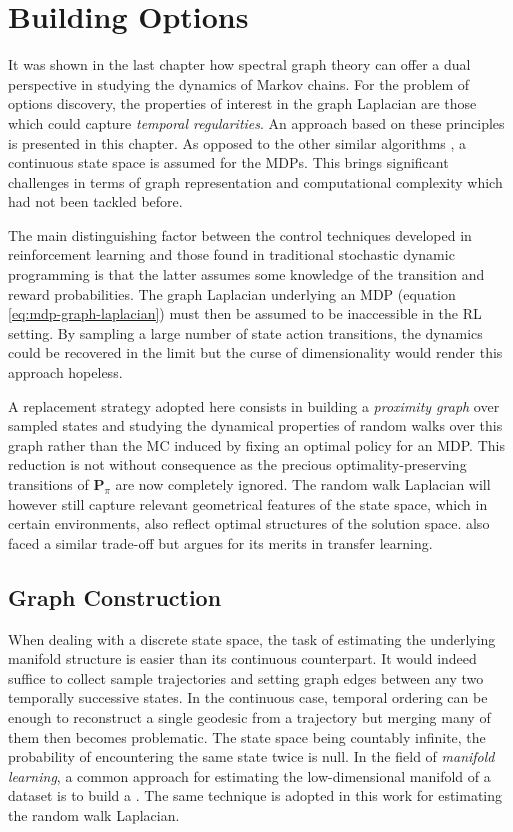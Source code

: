 \documentclass[12pt, oneside, extrafontsizes]{memoir}  %
\newcommand{\termidx}[1]{\index{#1}{\textbf{#1}}}
\theoremstyle{plain}
\theoremstyle{definition}
\begin{document}
\chapter{Building Options}

It was shown in the last chapter how spectral graph theory can offer a dual perspective
in studying the dynamics of Markov chains. For the problem of options discovery, the
properties of interest in the graph Laplacian are those which could capture
\textit{temporal regularities}. An approach based on these principles is presented in this chapter. As opposed to the other similar algorithms \cite{Menache2002, Mannor2004, Mathew2012, Bouvrie2012}, a continuous state space is assumed for the MDPs. This brings significant challenges in terms of graph representation and computational complexity which had not been tackled before.

The main distinguishing factor between the control techniques developed in
reinforcement learning and those found in traditional stochastic dynamic programming
is that the latter assumes some knowledge of the transition and reward probabilities. The graph Laplacian underlying an MDP (equation \ref{eq:mdp-graph-laplacian}) must then be assumed to be inaccessible in the RL setting. By sampling a large number of state action transitions, the dynamics could be recovered in the limit but the curse of dimensionality would render this approach hopeless.

A replacement strategy adopted here consists in building a \textit{proximity graph}
over sampled states and studying the dynamical properties of random walks over this
graph rather than the MC induced by fixing an optimal policy for an MDP. This reduction is not without consequence as the precious optimality-preserving transitions of $\mathbf{P}_\pi$ are now completely ignored. The random walk Laplacian will however still capture relevant geometrical features of the state space, which in certain environments,  also reflect optimal structures of the solution space. \cite{Mahadevan2007} also faced a similar trade-off but argues for its merits in transfer learning.

\section{Graph Construction}

When dealing with a discrete state space, the task of estimating the underlying manifold structure is easier than its continuous counterpart. It would indeed suffice to collect sample trajectories and setting graph edges between any two temporally successive states. In the continuous case, temporal ordering can be enough to reconstruct a single geodesic from a trajectory but merging many of them then becomes problematic. The state space being countably infinite, the probability of encountering the same state twice is null.  In the field of \textit{manifold learning}, a common approach for estimating the low-dimensional manifold of a dataset is to build a \termidx{proximity graph}. The same technique is adopted in this work for estimating the random walk Laplacian.
\end{document}
